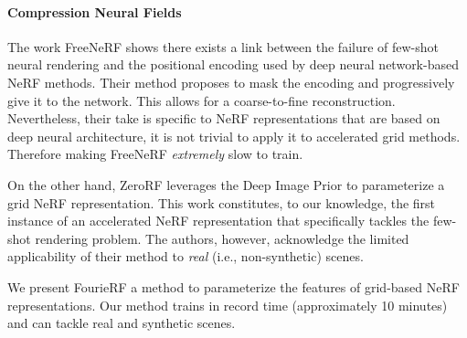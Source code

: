 

\vspace{-1em}\paragraph{Compression Neural Fields}

The work FreeNeRF \cite{yang2023freenerf} shows there exists a link between the failure of few-shot neural rendering and the positional encoding used by deep neural network-based NeRF methods. Their method proposes to mask the encoding and progressively give it to the network. This allows for a coarse-to-fine reconstruction. Nevertheless, their take is specific to NeRF representations that are based on deep neural architecture, it is not trivial to apply it to accelerated grid methods. Therefore making FreeNeRF \textit{extremely} slow to train.

On the other hand, ZeroRF \cite{shi2024zerorf} leverages the Deep Image Prior \cite{ulyanov2018deep} to parameterize a grid NeRF representation. This work constitutes, to our knowledge, the first instance of an accelerated NeRF representation that specifically tackles the few-shot rendering problem. The authors, however, acknowledge the limited applicability of their method to \textit{real} (i.e., non-synthetic) scenes.

We present FourieRF a method to parameterize the features of grid-based NeRF representations. Our method trains in record time (approximately 10 minutes) and can tackle real and synthetic scenes.

